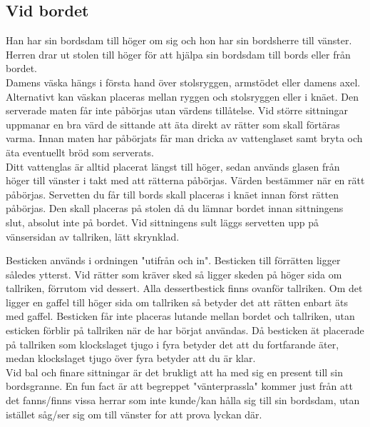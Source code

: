 \subsection*{Vid bordet}
Han har sin bordsdam till höger om sig och hon har sin bordsherre till vänster.
Herren drar ut stolen till höger för att hjälpa sin bordsdam till bords eller från bordet.
\\

Damens väska hängs i första hand över stolsryggen, armstödet eller damens axel.
Alternativt kan väskan placeras mellan ryggen och stolsryggen eller i knäet.
Den serverade maten får inte påbörjas utan värdens tillåtelse.
Vid större sittningar uppmanar en bra värd de sittande att äta direkt av rätter som skall förtäras varma.
Innan maten har påbörjats får man dricka av vattenglaset samt bryta och äta eventuellt bröd som serverats.
\\

Ditt vattenglas är alltid placerat längst till höger, sedan används glasen från höger till vänster i takt med att rätterna påbörjas.
Värden bestämmer när en rätt påbörjas.
Servetten du får till bords skall placeras i knäet innan först rätten påbörjas. Den skall placeras på stolen då du lämnar bordet innan sittningens slut, absolut inte på bordet.
Vid sittningens sult läggs servetten upp på vänsersidan av tallriken, lätt skrynklad.
\\

\newpage

Besticken används i ordningen "utifrån och in".
Besticken till förrätten ligger således ytterst.
Vid rätter som kräver sked så ligger skeden på höger sida om tallriken, förrutom vid dessert.
Alla dessertbestick finns ovanför tallriken.
Om det ligger en gaffel till höger sida om tallriken så betyder det att rätten enbart äts med gaffel.
Besticken får inte placeras lutande mellan bordet och tallriken, utan esticken förblir på tallriken när de har börjat användas. 
Då besticken ät placerade på tallriken som klockslaget tjugo i fyra betyder det att du fortfarande äter,
medan klockslaget tjugo över fyra betyder att du är klar.
\\

Vid bal och finare sittningar är det brukligt att ha med sig en present till sin bordsgranne. 
En fun fact är att begreppet "vänterprassla" kommer just från att det fanns/finns vissa herrar som inte kunde/kan hålla sig till sin bordsdam, 
utan istället såg/ser sig om till vänster for att prova lyckan där.

\newpage

